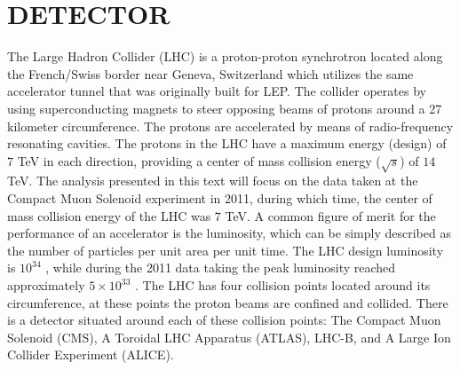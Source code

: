 \chapter{DETECTOR}
\label{chap:detector}
The Large Hadron Collider (LHC) is a proton-proton synchrotron located along the French/Swiss border near Geneva, Switzerland which utilizes the same accelerator tunnel that was originally built for LEP.
The collider operates by using superconducting magnets to steer opposing beams of protons around a 27 kilometer circumference. 
The protons are accelerated by means of radio-frequency resonating cavities.
The protons in the LHC have a maximum energy (design) of $7$ TeV in each direction, providing a center of mass collision energy ($\sqrt{s}$) of $14$ TeV.
The analysis presented in this text will focus on the data taken at the Compact Muon Solenoid experiment in 2011, during which time, the center of mass collision energy of the LHC was $7$ TeV.
A common figure of merit for the performance of an accelerator is the luminosity, which can be simply described as the number of particles per unit area per unit time.
The LHC design luminosity is $10^{34}$ \lumiunit, while during the 2011 data taking the peak luminosity reached approximately $5\times 10^{33}$ \lumiunit.
The LHC has four collision points located around its circumference, at these points the proton beams are confined and collided.
There is a detector situated around each of these collision points: The Compact Muon Solenoid (CMS), A Toroidal LHC Apparatus (ATLAS), LHC-B, and A Large Ion Collider Experiment (ALICE).

